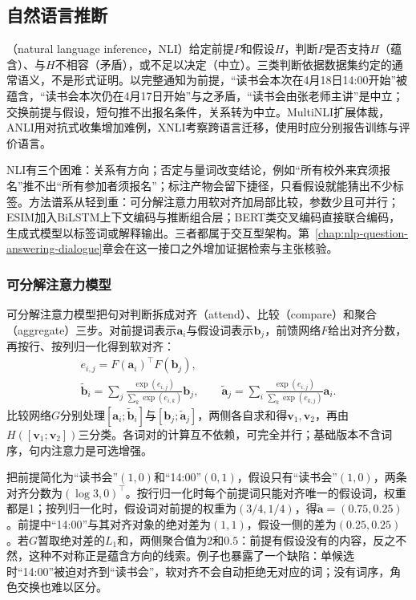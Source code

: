 \subsection{自然语言推断}
\label{sec:nlp-classification-nli}

（natural language inference，NLI）给定前提$P$和假设$H$，判断$P$是否支持$H$（蕴含）、与$H$不相容（矛盾），或不足以决定（中立）。三类判断依据数据集约定的通常语义，不是形式证明。以完整通知为前提，“读书会本次在4月18日14:00开始”被蕴含，“读书会本次仍在4月17日开始”与之矛盾，“读书会由张老师主讲”是中立；交换前提与假设，短句推不出报名条件，关系转为中立。MultiNLI扩展体裁，ANLI用对抗式收集增加难例，XNLI考察跨语言迁移，使用时应分别报告训练与评价语言。

NLI有三个困难：关系有方向；否定与量词改变结论，例如“所有校外来宾须报名”推不出“所有参加者须报名”；标注产物会留下捷径，只看假设就能猜出不少标签。方法谱系从轻到重：可分解注意力用软对齐加局部比较，参数少且可并行；ESIM加入BiLSTM上下文编码与推断组合层；BERT类交叉编码直接联合编码，生成式模型以标签词或解释输出。三者都属于交互型架构。第~\ref{chap:nlp-question-answering-dialogue}章会在这一接口之外增加证据检索与主张核验。

\subsubsection{可分解注意力模型}
\label{sec:nlp-classification-decomposable}

可分解注意力模型把句对判断拆成对齐（attend）、比较（compare）和聚合（aggregate）三步。对前提词表示$\bm a_i$与假设词表示$\bm b_j$，前馈网络$F$给出对齐分数，再按行、按列归一化得到软对齐：
\[
  \begin{gathered}
    e_{i,j}=F(\bm a_i)^\top F(\bm b_j),\\
    \widetilde{\bm b}_i=\sum_j\frac{\exp(e_{i,j})}{\sum_k\exp(e_{i,k})}\bm b_j,\qquad
    \widetilde{\bm a}_j=\sum_i\frac{\exp(e_{i,j})}{\sum_k\exp(e_{k,j})}\bm a_i.
  \end{gathered}
\]
比较网络$G$分别处理$[\bm a_i;\widetilde{\bm b}_i]$与$[\bm b_j;\widetilde{\bm a}_j]$，两侧各自求和得$\bm v_1,\bm v_2$，再由$H([\bm v_1;\bm v_2])$三分类。各词对的计算互不依赖，可完全并行；基础版本不含词序，句内注意力是可选增强。

把前提简化为“读书会”$(1,0)$和“14:00”$(0,1)$，假设只有“读书会”$(1,0)$，两条对齐分数为$(\log3,0)^\top$。按行归一化时每个前提词只能对齐唯一的假设词，权重都是1；按列归一化时，假设词对前提的权重为$(3/4,1/4)$，得$\widetilde{\bm a}=(0.75,0.25)$。前提中“14:00”与其对齐对象的绝对差为$(1,1)$，假设一侧的差为$(0.25,0.25)$。若$G$暂取绝对差的$L_1$和，两侧聚合值为$2$和$0.5$：前提有假设没有的内容，反之不然，这种不对称正是蕴含方向的线索。例子也暴露了一个缺陷：单候选时“14:00”被迫对齐到“读书会”，软对齐不会自动拒绝无对应的词；没有词序，角色交换也难以区分。

